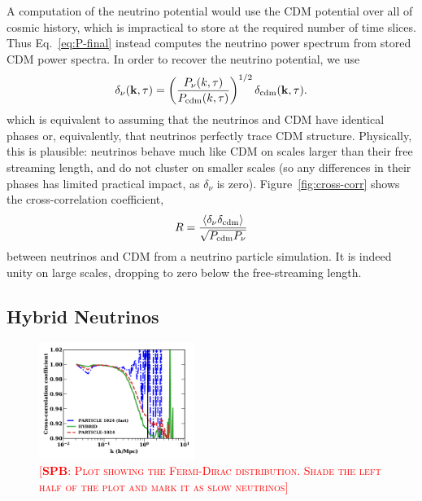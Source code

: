 \documentclass[useAMS, usenatbib]{mnras}
\newcommand{\bs}{\mathbf}
\newcommand{\spb}[1]{{\textsc{\textcolor{red}{[{\bf SPB}: #1]}}}}
\begin{document}
A computation of the neutrino potential would use the CDM potential over all of cosmic history, which is impractical
to store at the required number of time slices. Thus Eq.~\ref{eq:P-final} instead computes the neutrino power spectrum
from stored CDM power spectra. In order to recover the neutrino potential, we use
\begin{equation}
\delta_{\nu}(\bs k, \tau) = \left(\frac{P_{\nu}(k,
    \tau)}{P_{\rm cdm}(k, \tau)}\right)^{1/2} \delta_{\rm cdm}(\bs k, \tau).\label{eq:phases}
\end{equation}
which is equivalent to assuming that the neutrinos and CDM have identical phases or, equivalently,
that neutrinos perfectly trace CDM structure. Physically, this is plausible: neutrinos behave much like
CDM on scales larger than their free streaming length, and do not cluster on smaller scales (so any
differences in their phases has limited practical impact, as $\delta_\nu$ is zero).
Figure~\ref{fig:cross-corr} shows the cross-correlation coefficient,
\begin{equation}
R = \frac{\left\langle \delta_\nu \delta_\mathrm{cdm} \right\rangle}{\sqrt{P_{\rm{cdm}} P_{\rm{\nu}}}}
\end{equation}
between neutrinos and CDM from a neutrino particle simulation. It is indeed unity on large scales,
dropping to zero below the free-streaming length.

\subsection{Hybrid Neutrinos}
\label{sec:hybrid}

\begin{figure}
\includegraphics[width=0.45\textwidth]{nuplots/corr_coeff-1.pdf}
  \caption{\spb{Plot showing the Fermi-Dirac distribution. Shade the left half of the plot and mark it as slow neutrinos}
  }
  \label{fig:fddistribution}
\end{figure}
\end{document}
